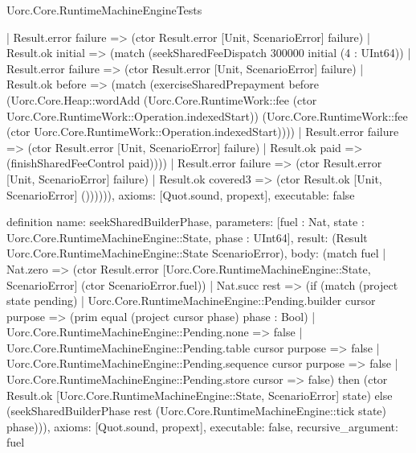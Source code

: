 \begin{lexlean}{Uorc.Core.RuntimeMachineEngineTests}
\begin{semanticmodule}
{            | Result.error failure => (ctor Result.error [Unit, ScenarioError] failure)
            | Result.ok initial => (match (seekSharedFeeDispatch 300000 initial (4 : UInt64))
              | Result.error failure => (ctor Result.error [Unit, ScenarioError] failure)
              | Result.ok before => (match (exerciseSharedPrepayment before (Uorc.Core.Heap::wordAdd (Uorc.Core.RuntimeWork::fee (ctor Uorc.Core.RuntimeWork::Operation.indexedStart)) (Uorc.Core.RuntimeWork::fee (ctor Uorc.Core.RuntimeWork::Operation.indexedStart))))
                | Result.error failure => (ctor Result.error [Unit, ScenarioError] failure)
                | Result.ok paid => (finishSharedFeeControl paid))))
          | Result.error failure => (ctor Result.error [Unit, ScenarioError] failure)
          | Result.ok covered3 => (ctor Result.ok [Unit, ScenarioError] ()))))),
  axioms: [Quot.sound, propext],
  executable: false
}

definition{
  name: seekSharedBuilderPhase,
  parameters: [fuel : Nat, state : Uorc.Core.RuntimeMachineEngine::State, phase : UInt64],
  result: (Result Uorc.Core.RuntimeMachineEngine::State ScenarioError),
  body: (match fuel
    | Nat.zero => (ctor Result.error [Uorc.Core.RuntimeMachineEngine::State, ScenarioError] (ctor ScenarioError.fuel))
    | Nat.succ rest => (if (match (project state pending)
      | Uorc.Core.RuntimeMachineEngine::Pending.builder cursor purpose => (prim equal (project cursor phase) phase : Bool)
      | Uorc.Core.RuntimeMachineEngine::Pending.none => false
      | Uorc.Core.RuntimeMachineEngine::Pending.table cursor purpose => false
      | Uorc.Core.RuntimeMachineEngine::Pending.sequence cursor purpose => false
      | Uorc.Core.RuntimeMachineEngine::Pending.store cursor => false) then (ctor Result.ok [Uorc.Core.RuntimeMachineEngine::State, ScenarioError] state) else (seekSharedBuilderPhase rest (Uorc.Core.RuntimeMachineEngine::tick state) phase))),
  axioms: [Quot.sound, propext],
  executable: false,
  recursive_argument: fuel
}


\end{semanticmodule}
\end{lexlean}
